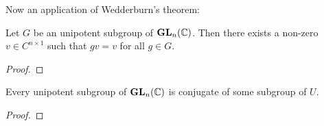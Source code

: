 Now an application of Wedderburn's theorem:

\begin{proposition}
    Let $G$ be an unipotent subgroup of $\mathbf{GL}_n(\mathbb{C})$. 
    Then there exists a non-zero 
    $v\in C^{n\times1}$ such that $gv=v$ for all $g\in G$. 
\end{proposition}

\begin{proof}
    
\end{proof}

\begin{theorem}[Kolchin]
\label{thm:Kolchin}
Every unipotent subgroup of $\mathbf{GL}_n(\mathbb{C})$ is conjugate
of some subgroup of $U$. 
\end{theorem}

\begin{proof}
    
\end{proof}

